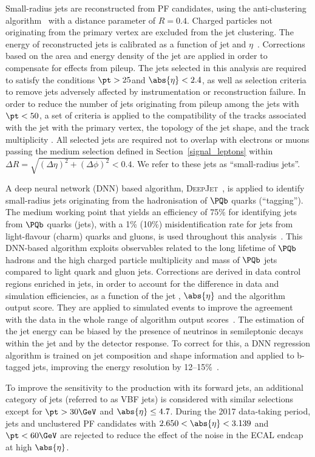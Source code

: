 { Small-radius jets are reconstructed from PF candidates, using the anti-\kt clustering algorithm~\cite{Cacciari:2008gp,Cacciari:2011ma} with a distance parameter of $R = 0.4$.
Charged particles not originating from the primary vertex are excluded from the jet clustering.
The energy of reconstructed jets is calibrated as a function of jet \pt and $\eta$~\cite{CMS-DP-2021-033,JES_JER_2017}.
Corrections based on the area and energy density of the jet are applied in order to compensate for effects from pileup.
The jets selected in this analysis are required to satisfy the conditions $\pt> 25$\GeV and $\abs{\eta} < 2.4$, as well as selection criteria to remove jets adversely affected by instrumentation or reconstruction failure. In order to reduce the number of jets originating from pileup among the jets with $\pt < 50$\GeV, a set of criteria is applied to the compatibility of the tracks associated with the jet with the primary vertex, the topology of the jet shape, and the track multiplicity \cite{PUJID}. All selected jets are required not to overlap with electrons or muons passing the medium selection defined in Section~\ref{signal_leptons} within $\Delta R = \sqrt{(\Delta \eta)^2 {+} (\Delta \phi)^2} < 0.4$. We refer to these jets as ``small-radius jets''.

A deep neural network (DNN) based algorithm, \textsc{DeepJet}~\cite{Bols:2020bkb}, is applied to identify small-radius jets originating from the hadronisation of $\Pbottom$ quarks (``\Pbottom tagging''). The medium working point that yields an efficiency of 75\% for identifying jets from $\Pbottom$ quarks (\Pbottom jets), with a 1\% (10\%) misidentification rate for jets from light-flavour (charm) quarks and gluons, is used throughout this analysis~\cite{CMS-DP-2018-058}. This DNN-based algorithm exploits observables related to the long lifetime of $\Pbottom$ hadrons and the high charged particle multiplicity and mass of $\Pbottom$ jets compared to light quark and gluon jets. Corrections are derived in data control regions enriched in \Pbottom jets, in order to account for the difference in data and simulation efficiencies, as a function of the jet \pt, $\abs{\eta}$ and the algorithm output score. They are applied to simulated events to improve the agreement with the data in the whole range of algorithm output scores~\cite{CMS-DP-2018-058}.
The estimation of the \Pbottom jet energy can be biased by the presence of neutrinos in semileptonic decays within the jet and by the detector response. To correct for this, a DNN regression algorithm is trained on jet composition and shape information and applied to b-tagged jets, improving the energy resolution by 12--15\%~\cite{CMS:2019uxx}.


To improve the sensitivity to the \VBF production with its forward jets, an additional category of jets (referred to as VBF jets) is considered with similar selections except for $\pt>30\GeV$ and $\abs{\eta} \leq 4.7$. During the 2017 data-taking period, jets and unclustered PF candidates with $2.650 <\abs{\eta} <3.139$ and $\pt < 60\GeV$ are rejected to reduce the effect of the noise in the ECAL endcap at high $\abs{\eta}$.}

